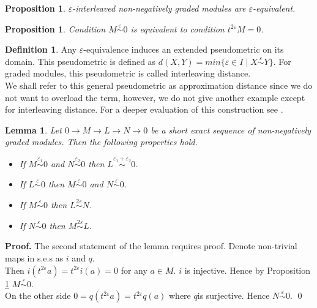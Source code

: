 \documentclass[a4paper, 12pt]{article}
\newcounter{stmcounter}[section]
\numberwithin{equation}{section}
\newtheorem{proposition}[stmcounter]{Proposition}
\newtheorem{lemma}[stmcounter]{Lemma}
\theoremstyle{definition}
\newtheorem{definition}[stmcounter]{Definition}
\theoremstyle{remark}
\newenvironment{pf}{\noindent\textbf{Proof.}}{\qed}
\begin{document}
\begin{proposition}
  $\varepsilon$-interleaved non-negatively graded modules are $\varepsilon$-equivalent.
\end{proposition}

\begin{proposition} {\cite[Proposition 2.13]{GS16}}
  \label{epstriv}
  Condition $M \stackrel{\varepsilon}{\sim} 0$ is equivalent to condition $t^{2\varepsilon}M = 0$.
\end{proposition}

\begin{definition}
  Any $\varepsilon$-equivalence induces an extended pseudometric on its domain. This pseudometric is defined as $d(X,Y) = min\{\varepsilon \in I\;|\;X \stackrel{\varepsilon}{\sim} Y\}$. For graded modules, this pseudometric is called interleaving distance. {\cite[Definition 2.12]{GS16}}\\
  We shall refer to this general pseudometric as approximation distance since we do not want to overload the term, however, we do not give another example except for interleaving distance. For a deeper evaluation of this construction see {\cite{deSilva18}}.
\end{definition}

\begin{lemma}
  \label{ops}
  Let $0 \to M \to L \to N \to 0$ be a short exact sequence of non-negatively graded modules. Then the following properties hold.
  \begin{itemize}
    \item If $M \stackrel{\varepsilon_1}{\sim} 0$ and $N \stackrel{\varepsilon_2}{\sim} 0$ then $L \stackrel{\varepsilon_1 + \varepsilon_2}{\sim} 0$. {\cite[Proposition 4.6]{GS16}}
    \item If $L \stackrel{\varepsilon}{\sim} 0$ then $M \stackrel{\varepsilon}{\sim} 0$ and $N \stackrel{\varepsilon}{\sim} 0$.
    \item If $M \stackrel{\varepsilon}{\sim} 0$ then $L \stackrel{2\varepsilon}{\sim} N$. {\cite[Proposition 4.1]{GS16}}
    \item If $N \stackrel{\varepsilon}{\sim} 0$ then $M \stackrel{2\varepsilon}{\sim} L$. {\cite[Proposition 4.1]{GS16}}
  \end{itemize}
\end{lemma}

\begin{pf}
  The second statement of the lemma requires proof. Denote non-trivial maps in s.e.s as $i$ and $q$.\\

  Then $i(t^{2\varepsilon}a) = t^{2\varepsilon}i(a) = 0$ for any $a \in M$. $i$ is injective. Hence by Proposition \ref{epstriv} $M \stackrel{\varepsilon}{\sim} 0$.\\

  On the other side $0 = q(t^{2\varepsilon}a) = t^{2\varepsilon}q(a)$ where $q$is surjective. Hence $N \stackrel{\varepsilon}{\sim} 0$.
\end{pf}
\end{document}
